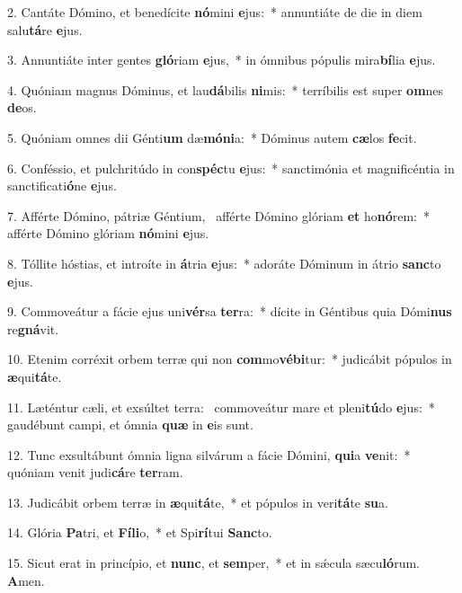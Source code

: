 2. Cantáte Dómino, et benedícite \textbf{nó}mini \textbf{e}jus:~*  annuntiáte de die in diem salu\textbf{tá}re \textbf{e}jus.\

3. Annuntiáte inter gentes \textbf{gló}riam \textbf{e}jus,~*  in ómnibus pópulis mira\textbf{bí}lia \textbf{e}jus.\

4. Quóniam magnus Dóminus, et lau\textbf{dá}bilis \textbf{ni}mis:~*  terríbilis est super \textbf{om}nes \textbf{de}os.\

5. Quóniam omnes dii Génti\textbf{um} dæ\textbf{mó}\textbf{ni}a:~*  Dóminus autem \textbf{cæ}los \textbf{fe}cit.\

6. Conféssio, et pulchritúdo in con\textbf{spéc}tu \textbf{e}jus:~*  sanctimónia et magnificéntia in sanctificati\textbf{ó}ne \textbf{e}jus.\

7. Afférte Dómino, pátriæ Géntium, \dag\  afférte Dómino glóriam \textbf{et} ho\textbf{nó}rem:~*  afférte Dómino glóriam \textbf{nó}mini \textbf{e}jus.\

8. Tóllite hóstias, et introíte in \textbf{á}tria \textbf{e}jus:~*  adoráte Dóminum in átrio \textbf{sanc}to \textbf{e}jus.\

9. Commoveátur a fácie ejus uni\textbf{vér}sa \textbf{ter}ra:~*  dícite in Géntibus quia Dómi\textbf{nus} re\textbf{gná}vit.\

10. Etenim corréxit orbem terræ qui non \textbf{com}mo\textbf{vé}\textbf{bi}tur:~*  judicábit pópulos in \textbf{æ}qui\textbf{tá}te.\

11. Læténtur cæli, et exsúltet terra: \dag\  commoveátur mare et pleni\textbf{tú}do \textbf{e}jus:~*  gaudébunt campi, et ómnia \textbf{quæ} in \textbf{e}is sunt.\

12. Tunc exsultábunt ómnia ligna silvárum a fácie Dómini, \textbf{qui}a \textbf{ve}nit:~*  quóniam venit judi\textbf{cá}re \textbf{ter}ram.\

13. Judicábit orbem terræ in \textbf{æ}qui\textbf{tá}te,~*  et pópulos in veri\textbf{tá}te \textbf{su}a.\

14. Glória \textbf{Pa}tri, et \textbf{Fí}\textbf{li}o,~*  et Spi\textbf{rí}tui \textbf{Sanc}to.\

15. Sicut erat in princípio, et \textbf{nunc}, et \textbf{sem}per,~*  et in sǽcula sæcu\textbf{ló}rum. \textbf{A}men.\

